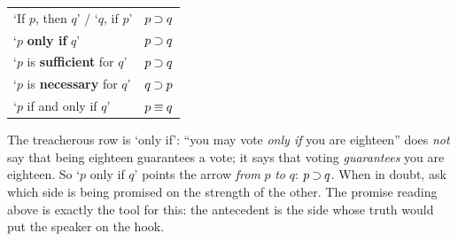 \documentclass[options]{philosophersimprint}
\theoremstyle{definition}
\begin{document}
\begin{center}
\begin{tabular}{l l}
`If $p$, then $q$' \quad / \quad `$q$, if $p$' & $p \mathbin{\supset} q$\\
`$p$ \textbf{only if} $q$' & $p \mathbin{\supset} q$\\
`$p$ is \textbf{sufficient} for $q$' & $p \mathbin{\supset} q$\\
`$p$ is \textbf{necessary} for $q$' & $q \mathbin{\supset} p$\\
`$p$ if and only if $q$' & $p \mathbin{\equiv} q$\\
\end{tabular}
\end{center}
\vspace{-0.2cm}
The treacherous row is `only if': ``you may vote \textit{only if} you are eighteen'' does \textit{not} say that being eighteen guarantees a vote; it says that voting \textit{guarantees} you are eighteen. So `$p$ only if $q$' points the arrow \textit{from} $p$ \textit{to} $q$: $p \mathbin{\supset} q$. When in doubt, ask which side is being promised on the strength of the other. The promise reading above is exactly the tool for this: the antecedent is the side whose truth would put the speaker on the hook.
\end{document}
